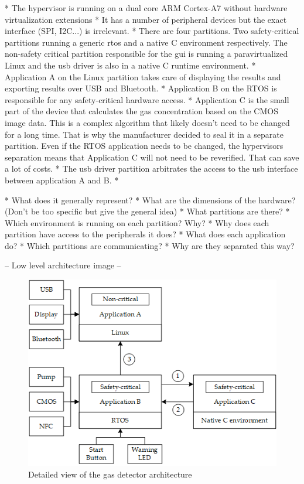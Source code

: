 \newcommand{\bToa}{3}
\newcommand{\bToc}{1}
\newcommand{\cTob}{2}
\newcommand{\usbToa}{4}
\newcommand{\aTousb}{4}
\newcommand{\usbTob}{5}
\newcommand{\bTousb}{5}

* The hypervisor is running on a dual core ARM Cortex-A7 without hardware virtualization extensions
* It has a number of peripheral devices but the exact interface (SPI, I2C...) is irrelevant.
* There are four partitions. Two safety-critical partitions running a generic \acrshort{rtos} and a native C environment respectively. The non-safety critical partition responsible for the \acrshort{gui} is running a paravirtualized Linux and the \acrshort{usb} driver is also in a native C runtime environment.
* Application A on the Linux partition takes care of displaying the results and exporting results over USB and Bluetooth.
* Application B on the RTOS is responsible for any safety-critical hardware access.
* Application C is the small part of the device that calculates the gas concentration based on the CMOS image data. This is a complex algorithm that likely doesn't need to be changed for a long time. That is why the manufacturer decided to seal it in a separate partition. Even if the RTOS application needs to be changed, the hypervisors separation means that Application C will not need to be reverified. That can save a lot of costs.
* The \acrshort{usb} driver partition arbitrates the access to the \acrshort{usb} interface between application A and B. 
* 

* What does it generally represent?
* What are the dimensions of the hardware? (Don't be too specific but give the general idea)
* What partitions are there?
* Which environment is running on each partition? Why?
* Why does each partition have access to the peripherals it does?
* What does each application do?
* Which partitions are communicating?
* Why are they separated this way?

-- Low level architecture image --
\begin{figure}[ht!]
\centering
\includegraphics[scale=0.50]{Figures/gas_detect_low_level.png}
\decoRule
\caption{Detailed view of the gas detector architecture}
\label{fig:gas_detect_low_leve}
\end{figure}
